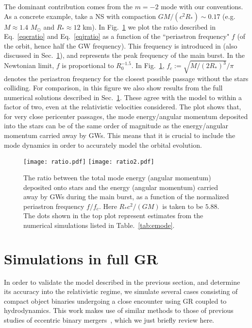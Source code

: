 \documentclass[prd,aps,floatfix,superscriptaddress,nofootinbib,twocolumn,10pt,English]{revtex4}
\begin{document}
The dominant contribution comes from the $m=-2$ mode with our
conventions. As a concrete example, take a NS with compaction $G
M/(c^2 R_*) \sim 0.17$ (e.g.  $M \approx 1.4$ $M_\odot$ and $R_*
\approx 12$ km). In Fig.~\ref{fig:ratioplot} we plot the ratio
described in Eq.~\eqref{eqeratio} and Eq.~\eqref{eqjratio} as a
function of the ``periastron frequency" $f$ (of the orbit, hence
half the GW frequency). This frequency is
introduced in \cite{loutrel2017eccentric,chirenti2016gravitational}
(also discussed in Sec.~\ref{sec4}), and represents the peak frequency
of the main burst. In the Newtonian limit, $f$ is proportional to
$R_0^{-1.5}$. In Fig.~\ref{fig:ratioplot}, $f_c := \sqrt{M/(2 R_*)^3}/\pi$ denotes the
periastron frequency for the closest possible passage without the
stars colliding.  For comparison, in this figure we also show results
from the full numerical solutions described in Sec.~\ref{sec4}. These
agree with the model to within a factor of two, even at the
relativistic velocities considered.  The plot shows that, for very
close pericenter passages, the mode energy/angular momentum deposited
into the stars can be of the same order of magnitude as the
energy/angular momentum carried away by GWs. This means that it is
crucial to include the mode dynamics in order to accurately model the
orbital evolution.


\begin{figure}[tb]
\texttt{[image: ratio.pdf]}
\texttt{[image: ratio2.pdf]}
\caption{The ratio between the total mode energy (angular momentum) deposited onto stars and the energy (angular momentum) carried away by GWs during the main burst, as a function of the normalized periastron frequency $f/f_c$. Here $R_* c^2/(G M)$ is taken to be $5.88$.
   The dots shown in the top plot represent estimates from the numerical simulations listed in Table.~\ref{tab:emode}.
}
\label{fig:ratioplot}
\end{figure}

\section{Simulations in full GR}\label{sec4}

In order to validate the model described in the previous section, and determine
its accuracy into the relativistic regime, we simulate several cases consisting
of compact object binaries undergoing a close encounter using GR coupled to
hydrodynamics.  This work makes use of similar methods to those of previous
studies of eccentric binary
mergers~\cite{East:2011xa,East:2012ww,Paschalidis:2015mla,East:2015vix,East:2016zvv},
which we just briefly review here.
\end{document}
